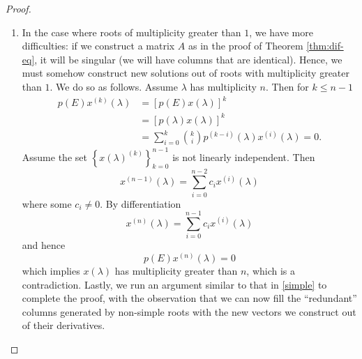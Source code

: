 \documentclass[12pt,reqno]{amsart}
\numberwithin{equation}{section}  %
\newcommand{\rr}{\mathbb{R}}
\begin{document}
\begin{proof}
\begin{enumerate}
non-zero, via induction. For the base case, we consider the $1 \times 1$
sub-matrix $[\lambda_m^m]$, which has non-zero determinant (we assumed
a priori that the $\lambda_i$ are non-zero). For the inductive step,
we assume the sub-matrix with diagonal entries $\lambda_2^2$ to $\lambda_m^m$ has non-zero
determinant. Then it is easy to see that $A$ has non-zero determinant by taking
its principal minor at $\lambda_1$. 
Since A is a map from $\rr^m$ to itself, it follows that dimension of the nullspace of $A$ is $0$. Hence, $A$ is
non-singular, and so completely determines the $a_i$, for $1 \le i \le m$. 
As a corollary of this argument, we obtain that the vectors $u^{(k)}$ are linearly
independent. We now repeat the argument to obtain the next $m$ constants $a_i$. A simple 
induction completes the proof. 
\item
In the case where roots of multiplicity greater than $1$, we have more
difficulties: if we construct a matrix $A$ as in the proof of
Theorem \ref{thm:dif-eq}, it will be singular (we will have columns that are
identical). Hence, we must somehow construct new solutions out of roots with
multiplicity greater than $1$. We do so as
follows. Assume $\lambda$ has multiplicity $n$. Then for $k \le n-1$
\begin{align*}
p(E)x^{(k)}(\lambda)
& = [ p(E)x(\lambda) ]^{k} 
\\
& = [ p(\lambda)x(\lambda) ]^{k} 
\\
& = \sum_{i = 0}^{k} \binom{k}{i}p^{(k-i)}(\lambda) x^{(i)}(\lambda) = 0.
\end{align*}
Assume the set $ \left\{ x(\lambda)^{(k)} \right\}_{k=0}^{n-1} $ is not linearly
independent.
Then
\begin{equation*}
x^{(n-1)}(\lambda) = \sum_{i=0}^{n-2} c_i x^{(i)}(\lambda)
\end{equation*}
where some $c_i \neq 0$. By differentiation
\begin{equation*}
x^{(n)}(\lambda) = \sum_{i=0}^{n-1} c_i x^{(i)}(\lambda)
\end{equation*}
and hence
\begin{equation*}
p(E)x^{(n)}(\lambda) = 0
\end{equation*}
which implies $x(\lambda)$ has multiplicity greater than $n$, which is
a contradiction. Lastly, we run an argument similar to that in \eqref{simple}
to complete the proof, with the observation that we can now fill the
``redundant'' columns generated by non-simple roots 
with the new vectors we construct out of their derivatives.
\end{enumerate}
\end{proof}
\end{document}
